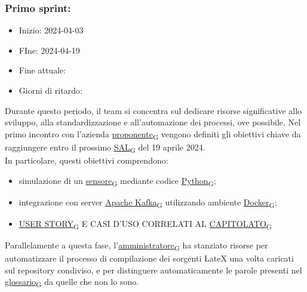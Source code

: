     \subsubsection{Primo sprint:}
        \begin{itemize}
            \item Inizio: 2024-04-03
            \item FIne: 2024-04-19
            \item Fine attuale: 
            \item Giorni di ritardo: 
        \end{itemize}
        Durante questo periodo, il team si concentra sul dedicare risorse significative allo sviluppo, alla standardizzazione e all'automazione dei processi, ove possibile. Nel primo incontro con l'azienda \href{https://7last.github.io/docs/rtb/documentazione-interna/glossario\#proponente}{proponente\textsubscript{G}} vengono definiti gli obiettivi chiave da raggiungere entro il prossimo \href{https://7last.github.io/docs/rtb/documentazione-interna/glossario\#sal}{SAL\textsubscript{G}} del 19 aprile 2024. \\In particolare, questi obiettivi comprendono:
        \begin{itemize}
            \item simulazione di un \href{https://7last.github.io/docs/rtb/documentazione-interna/glossario\#sensore}{sensore\textsubscript{G}} mediante codice \href{https://7last.github.io/docs/rtb/documentazione-interna/glossario\#python}{Python\textsubscript{G}};
            \item integrazione con server \href{https://7last.github.io/docs/rtb/documentazione-interna/glossario\#apache-kafka}{Apache Kafka\textsubscript{G}} utilizzando ambiente \href{https://7last.github.io/docs/rtb/documentazione-interna/glossario\#docker}{Docker\textsubscript{G}};
            \item \href{https://7last.github.io/docs/rtb/documentazione-interna/glossario\#user-story}{USER STORY\textsubscript{G}} E CASI D'USO CORRELATI AL \href{https://7last.github.io/docs/rtb/documentazione-interna/glossario\#capitolato}{CAPITOLATO\textsubscript{G}}
        \end{itemize}

        Parallelamente a questa fase, l'\href{https://7last.github.io/docs/rtb/documentazione-interna/glossario\#amministratore}{amministratore\textsubscript{G}} ha stanziato risorse per automatizzare il processo di compilazione dei sorgenti LateX una volta caricati sul repository condiviso, e per distinguere automaticamente le parole presenti nel \href{https://7last.github.io/docs/rtb/documentazione-interna/glossario\#glossario}{glossario\textsubscript{G}} da quelle che non lo sono.

